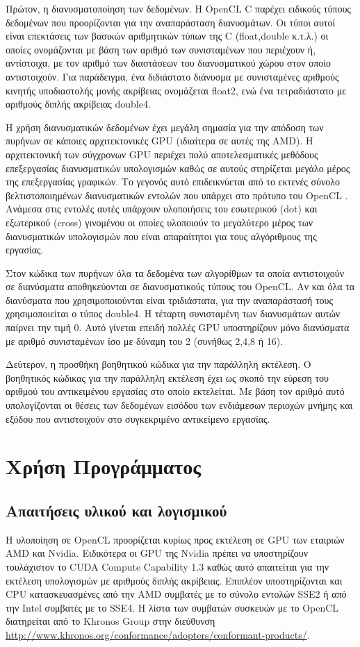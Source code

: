 Πρώτον, η διανυσματοποίηση των δεδομένων. H OpenCL C παρέχει ειδικούς τύπους δεδομένων που προορίζονται για την αναπαράσταση διανυσμάτων. Οι τύποι αυτοί είναι επεκτάσεις των βασικών αριθμητικών τύπων της C (float,double κ.τ.λ.) οι οποίες ονομάζονται με βάση των αριθμό των συνισταμένων που περιέχουν ή, αντίστοιχα, με τον αριθμό των διαστάσεων του διανυσματικού χώρου στον οποίο αντιστοιχούν. Για παράδειγμα, ένα διδιάστατο διάνυσμα με συνισταμένες αριθμούς κινητής υποδιαστολής μονής ακρίβειας ονομάζεται float2, ενώ ένα τετραδιάστατο με αριθμούς διπλής ακρίβειας double4. 

Η χρήση διανυσματικών δεδομένων έχει μεγάλη σημασία για την απόδοση των πυρήνων σε κάποιες αρχιτεκτονικές GPU (ιδιαίτερα σε αυτές της AMD). Η αρχιτεκτονική των σύγχρονων GPU περιέχει πολύ αποτελεσματικές μεθόδους επεξεργασίας διανυσματικών υπολογισμών καθώς σε αυτούς στηρίζεται μεγάλο μέρος της επεξεργασίας γραφικών. Το γεγονός αυτό επιδεικνύεται από το εκτενές σύνολο βελτιστοποιημένων διανυσματικών εντολών που υπάρχει στο πρότυπο του OpenCL \cite{OpenCLSpec}. Ανάμεσα στις εντολές αυτές υπάρχουν υλοποιήσεις του εσωτερικού (dot) και εξωτερικού (cross) γινομένου οι οποίες υλοποιούν το μεγαλύτερο μέρος των διανυσματικών υπολογισμών που είναι απαραίτητοι για τους αλγόριθμους της εργασίας.

Στον κώδικα των πυρήνων όλα τα δεδομένα των αλγορίθμων τα οποία αντιστοιχούν σε διανύσματα αποθηκεύονται σε διανυσματικούς τύπους του OpenCL. Αν και όλα τα διανύσματα που χρησιμοποιούνται είναι τριδιάστατα,  για την αναπαράστασή τους χρησιμοποιείται ο τύπος double4. Η τέταρτη συνισταμένη των διανυσμάτων αυτών παίρνει την τιμή 0. Αυτό γίνεται επειδή πολλές GPU υποστηρίζουν μόνο διανύσματα με αριθμό συνισταμένων ίσο με δύναμη του 2 (συνήθως 2,4,8 ή 16). 

Δεύτερον, η προσθήκη βοηθητικού κώδικα για την παράλληλη εκτέλεση. Ο βοηθητικός κώδικας για την παράλληλη εκτέλεση έχει ως σκοπό την εύρεση του αριθμού του αντικειμένου εργασίας στο οποίο εκτελείται. Με βάση τον αριθμό αυτό υπολογίζονται οι θέσεις των δεδομένων εισόδου των ενδιάμεσων περιοχών μνήμης και εξόδου που αντιστοιχούν στο συγκεκριμένο αντικείμενο εργασίας.

\section{Χρήση Προγράμματος}

\subsection{Απαιτήσεις υλικού και λογισμικού}
\noindent Η υλοποίηση σε OpenCL προορίζεται κυρίως προς εκτέλεση σε GPU των εταιριών AMD και Nvidia. Ειδικότερα οι GPU της Nvidia πρέπει να υποστηρίζουν τουλάχιστον το CUDA Compute Capability 1.3 καθώς αυτό απαιτείται για την εκτέλεση υπολογισμών με αριθμούς διπλής ακρίβειας.  Επιπλέον υποστηρίζονται και CPU κατασκευασμένες από την AMD συμβατές με το σύνολο εντολών SSE2 ή από την Intel συμβατές με το SSE4. Η λίστα των  συμβατών συσκευών με το OpenCL διατηρείται από το Khronos Group στην διεύθυνση \url{http://www.khronos.org/conformance/adopters/conformant-products/}.

